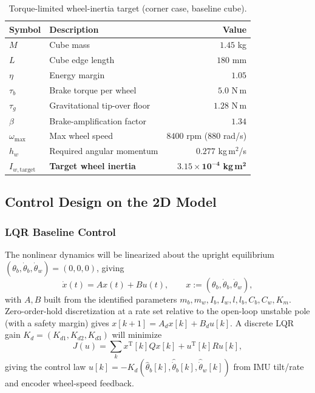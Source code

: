 \begin{table}[h]
\centering
\caption{Torque-limited wheel-inertia target (corner case, baseline cube).}
\label{tab:jumpup_budget}
\begin{tabular}{llr}
\toprule
Symbol & Description & Value \\
\midrule
$M$                & Cube mass                    & $1.45$ kg \\
$L$                & Cube edge length             & $180$ mm \\
$\eta$             & Energy margin                & $1.05$ \\
$\tau_b$           & Brake torque per wheel       & $5.0$ N\,m \\
$\tau_g$           & Gravitational tip-over floor & $1.28$ N\,m \\
$\beta$            & Brake-amplification factor   & $1.34$ \\
$\omega_{\max}$    & Max wheel speed              & $8400$ rpm ($880$ rad/s) \\
$h_w$              & Required angular momentum    & $0.277$ kg\,m$^2$/s \\
$I_{w,\text{target}}$ & \textbf{Target wheel inertia} & $\mathbf{3.15\times10^{-4}}$ \textbf{kg\,m}$^\mathbf{2}$ \\
\bottomrule
\end{tabular}
\end{table}

\subsection{Control Design on the 2D Model}
\label{sec:control2d}

\subsubsection{LQR Baseline Control}

The nonlinear dynamics will be linearized about the upright equilibrium $(\theta_b,\dot\theta_b,\dot\theta_w)=(0,0,0)$, giving
\begin{equation}
\dot x(t) = Ax(t) + Bu(t), \qquad x := (\theta_b,\dot\theta_b,\dot\theta_w),
\end{equation}
with $A, B$ built from the identified parameters $m_b, m_w, I_b, I_w, l, l_b, C_b, C_w, K_m$. Zero-order-hold discretization at a rate set relative to the open-loop unstable pole (with a safety margin) gives $x[k+1] = A_dx[k] + B_du[k]$.
\newpage
A discrete LQR gain $K_d = (K_{d1}, K_{d2}, K_{d3})$ will minimize
\begin{equation}
J(u) = \sum_k x^{\mathrm T}[k]Qx[k] + u^{\mathrm T}[k]Ru[k],
\end{equation}
giving the control law $u[k] = -K_d(\hat\theta_b[k], \hat{\dot\theta}_b[k], \hat{\dot\theta}_w[k])$ from IMU tilt/rate and encoder wheel-speed feedback.

